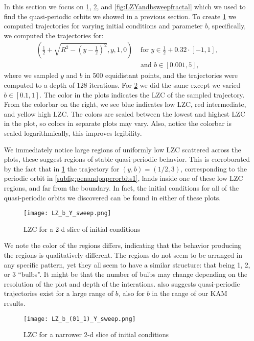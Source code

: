 In this section we focus on \cref{fig:LZYandbsweepwide}, \ref{fig:LZYandbsweepnarrow}, and \ref{fig:LZYandbsweepfractal} which we used to find the quasi-periodic orbits we showed in a previous section. To create \cref{fig:LZYandbsweepwide} we computed trajectories for varying initial conditions and parameter $b$, specifically, we computed the trajectories for:
\begin{align*}
\left(\frac{1}{2}+\sqrt{R^2-\left(y-\frac{1}{2}\right)^2} , y, 1, 0\right) 
&\text{ for } y\in \frac{1}{2}+ 0.32\cdot [-1,1],\\ 
&\text{ and } b\in [0.001, 5],
\end{align*}
where we sampled $y$ and $b$ in 500 equidistant points, and the trajectories were computed to a depth of 128 iterations. For \cref{fig:LZYandbsweepnarrow} we did the same except we varied $b\in[0.1,1]$. The color in the plots indicates the LZC of the sampled trajectory. From the colorbar on the right, we see blue indicates low LZC, red intermediate, and yellow high LZC. The colors are scaled between the lowest and highest LZC in the plot, so colors in separate plots may vary. Also, notice the colorbar is scaled logarithmically, this improves legibility.

We immediately notice large regions of uniformly low LZC scattered across the plots, these suggest regions of stable quasi-periodic behavior. This is corroborated by the fact that in \cref{fig:LZYandbsweepwide} the trajectory for $(y,b)=(1/2,3)$, corresponding to the periodic orbit in \cref{subfig:penandpaperorbits1}, lands inside one of these low LZC regions, and far from the boundary. In fact, the initial conditions for all of the quasi-periodic orbits we discovered can be found in either of these plots. 
\begin{figure}[!th]
\centering
\texttt{[image: LZ\_b\_Y\_sweep.png]}
\caption{LZC for a 2-d slice of initial conditions}
\label{fig:LZYandbsweepwide}
\end{figure}

We note the color of the regions differs, indicating that the behavior producing the regions is qualitatively different. The regions do not seem to be arranged in any specific pattern, yet they all seem to have a similar structure: that being 1, 2, or 3 ``bulbs''. It might be that the number of bulbs may change depending on the resolution of the plot and depth of the interations.  also suggests quasi-periodic trajectories exist for a large range of $b$, also for $b$ in the range of our KAM results.
\begin{figure}[!th]
\centering
\texttt{[image: LZ\_b\_(01\_1)\_Y\_sweep.png]}
\caption{LZC for a narrower 2-d slice of initial conditions}
\label{fig:LZYandbsweepnarrow}
\end{figure}

